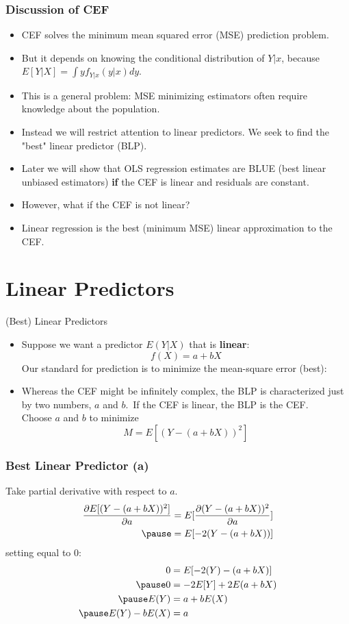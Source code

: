 \documentclass[aspectratio=169, handout]{beamer}
\numberwithin{equation}{section}
\begin{document}
\begin{frame}
\frametitle{Discussion of CEF}
\begin{itemize}
\item CEF solves the minimum mean squared error (MSE) prediction problem.
\item But it depends on knowing the conditional distribution of $Y|x$, because $E[Y|X]=\int y f_{Y|x}(y|x)dy$.\pause
\item This is a general problem: MSE minimizing estimators often require knowledge about the population.\pause
\item Instead we will restrict attention to linear predictors. \pause  We seek to find the "best" linear predictor (BLP). \pause
\item Later we will show that OLS regression estimates are BLUE (best linear unbiased estimators) \textbf{if} the CEF is linear and residuals are constant. \pause
\item However, what if the CEF is not linear? \pause
\item Linear regression is the best (minimum MSE) linear approximation to the CEF. 
\end{itemize}
\end{frame}

\section{Linear Predictors}

\begin{frame}{(Best) Linear Predictors}

\begin{itemize}
\item Suppose we want a predictor $E(Y|X)$ that is \textbf{linear}:
$$f(X)=a+bX$$\pause
Our standard for prediction is to minimize the mean-square error (best): \\
\item Whereas the CEF might be infinitely complex, the BLP is characterized just by two numbers, $a$ and $b$.\pause \ If the CEF is linear, the BLP is the CEF.\\
\pause
Choose $a$ and $b$ to minimize
$$M=E[(Y-(a+bX))^2]$$
\end{itemize}
\end{frame}

\begin{frame}
\frametitle{Best Linear Predictor (a)}
Take partial derivative with respect to $a$.\pause
\begin{align*}
\frac{\partial E[(Y-(a+bX))^2]}{\partial a} &= E[\frac{\partial(Y-(a+bX))^2}{\partial a}]\\\pause
&= E[ -2(Y-(a+bX))]
\end{align*} \pause
setting equal to 0:\pause
\begin{align*}
0&=  E[-2(Y)-(a+bX)]\\\pause
0&=  -2E[Y]+2E(a+bX)\\\pause
E(Y)&= a+bE(X)\\\pause
E(Y)-bE(X)&= a
\end{align*} 
\end{frame}
\end{document}
